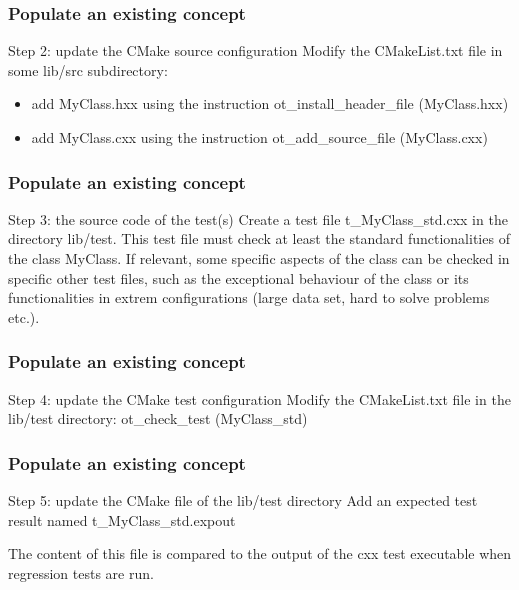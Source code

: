 \documentclass[8pt]{beamer}
\begin{document}
\begin{frame}
  \frametitle{Populate an existing concept}
  \begin{block}{Step 2: update the CMake source configuration}
    Modify the CMakeList.txt file in some lib/src subdirectory:
    \begin{itemize}
    \item add MyClass.hxx using the instruction {\ttfamily ot\_install\_header\_file (MyClass.hxx)}
    \item add MyClass.cxx using the instruction {\ttfamily ot\_add\_source\_file (MyClass.cxx)}
    \end{itemize}
  \end{block}
\end{frame}
\begin{frame}
  \frametitle{Populate an existing concept}
  \begin{block}{Step 3: the source code of the test(s)}
    Create a test file t\_MyClass\_std.cxx in the directory lib/test. This test file must check at least the standard functionalities of the class MyClass. If relevant, some specific aspects of the class can be checked in specific other test files, such as the exceptional behaviour of the class or its functionalities in extrem configurations (large data set, hard to solve problems etc.).
  \end{block}
\end{frame}
\begin{frame}
  \frametitle{Populate an existing concept}
  \begin{block}{Step 4: update the CMake test configuration}
    Modify the CMakeList.txt file in the lib/test directory:
    {\ttfamily ot\_check\_test (MyClass\_std)}
  \end{block}
\end{frame}
\begin{frame}
  \frametitle{Populate an existing concept}
  \begin{block}{Step 5: update the CMake file of the lib/test directory}
    Add an expected test result named t\_MyClass\_std.expout
    
    The content of this file is compared to the output of the cxx test executable when regression tests are run.

  \end{block}
\end{frame}
\end{document}
